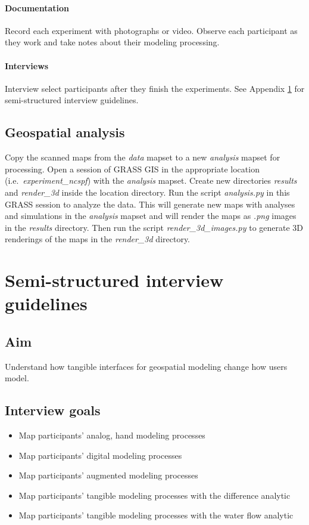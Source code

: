 \documentclass[prodmode,acmtochi]{acmsmall} %
\begin{document}
\paragraph{Documentation}
Record each experiment with photographs or video.
Observe each participant as they work
and take notes about their modeling processing.

\paragraph{Interviews}
Interview select participants after they finish the experiments. 
See Appendix \ref{appendix:guidelines} for semi-structured interview guidelines.

\subsection{Geospatial analysis}\label{appendix:analysis}
Copy the scanned maps from the \emph{data} mapset 
to a new \emph{analysis} mapset for processing. 
Open a session of GRASS GIS 
in the appropriate location (i.e.~\emph{experiment{\_ncspf}}) 
with the \emph{analysis} mapset.
Create new directories \emph{results} and \emph{render\_3d} 
inside the location directory.
Run the script \emph{analysis.py} in this GRASS session to analyze the data. 
This will generate new maps with analyses and simulations in the \emph{analysis} mapset
and will render the maps as \emph{.png} images in the \emph{results} directory.
Then run the script \emph{render\_3d\_images.py} 
to generate 3D renderings of the maps in the \emph{render\_3d} directory.

\vfill
\pagebreak

\section{Semi-structured interview guidelines}\label{appendix:guidelines}
\vspace*{0.5em}

\subsection{Aim}
Understand how tangible interfaces for geospatial modeling change how users model.
\vspace*{0.5em}

\subsection{Interview goals}
\begin{itemize}
\item Map participants' analog, hand modeling processes
\item Map participants' digital modeling processes
\item Map participants' augmented modeling processes
\item Map participants' tangible modeling processes with the difference analytic
\item Map participants' tangible modeling processes with the water flow analytic
\end{itemize}
\vspace*{0.5em}
\end{document}
